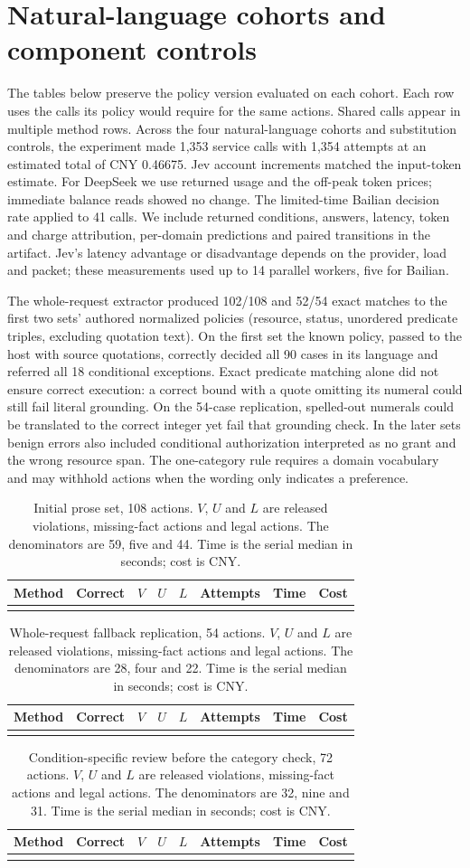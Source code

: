 \section{Natural-language cohorts and component controls}\label{app:prose}
The tables below preserve the policy version evaluated on each cohort. Each row uses the calls its policy would require for the same actions. Shared calls appear in multiple method rows. Across the four natural-language cohorts and substitution controls, the experiment made 1,353 service calls with 1,354 attempts at an estimated total of CNY 0.46675. Jev account increments matched the input-token estimate. For DeepSeek we use returned usage and the off-peak token prices; immediate balance reads showed no change. The limited-time Bailian decision rate applied to 41 calls. We include returned conditions, answers, latency, token and charge attribution, per-domain predictions and paired transitions in the artifact. Jev's latency advantage or disadvantage depends on the provider, load and packet; these measurements used up to 14 parallel workers, five for Bailian.

The whole-request extractor produced 102/108 and 52/54 exact matches to the first two sets' authored normalized policies (resource, status, unordered predicate triples, excluding quotation text). On the first set the known policy, passed to the host with source quotations, correctly decided all 90 cases in its language and referred all 18 conditional exceptions. Exact predicate matching alone did not ensure correct execution: a correct bound with a quote omitting its numeral could still fail literal grounding. On the 54-case replication, spelled-out numerals could be translated to the correct integer yet fail that grounding check. In the later sets benign errors also included conditional authorization interpreted as no grant and the wrong resource span. The one-category rule requires a domain vocabulary and may withhold actions when the wording only indicates a preference.

\newcommand{\prosetable}[3]{\begin{table}[htbp]\centering\small\setlength{\tabcolsep}{4pt}
\caption{#1. $V$, $U$ and $L$ are released violations, missing-fact actions and legal actions. #2. Time is the serial median in seconds; cost is CNY.}
\begin{tabular}{lrrrrrrr}\toprule Method & Correct & $V$ & $U$ & $L$ & Attempts & Time & Cost\\\midrule
\tablerows{#3}\bottomrule\end{tabular}\end{table}}
\prosetable{Initial prose set, 108 actions}{The denominators are 59, five and 44}{generated/natural.tex}
\prosetable{Whole-request fallback replication, 54 actions}{The denominators are 28, four and 22}{generated/replication.tex}
\prosetable{Condition-specific review before the category check, 72 actions}{The denominators are 32, nine and 31}{generated/confirmation.tex}
\FloatBarrier
